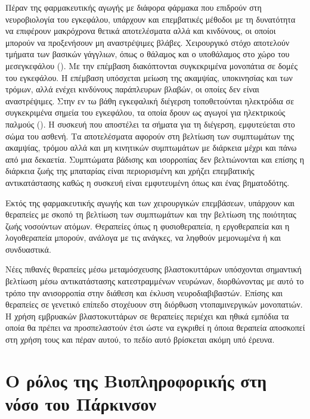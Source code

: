 \documentclass[12pt]{report}
\begin{document}
        \par
        Πέραν της φαρμακευτικής αγωγής με διάφορα φάρμακα που επιδρούν στη νευροβιολογία του εγκεφάλου, υπάρχουν και επεμβατικές μέθοδοι με τη δυνατότητα να επιφέρουν μακρόχρονα θετικά αποτελέσματα αλλά και κινδύνους, οι οποίοι μπορούν να προξενήσουν μη αναστρέψιμες βλάβες. Χειρουργικό στόχο αποτελούν τμήματα των βασικών γάγγλιων, όπως ο θάλαμος και ο υποθάλαμος στο χώρο του μεσεγκεφάλου (\emph{\cite{Starr1998AblativeDisease}}). Με την επέμβαση διακόπτονται συγκεκριμένα μονοπάτια σε δομές του εγκεφάλου. Η επέμβαση υπόσχεται μείωση της ακαμψίας, υποκινησίας και των τρόμων, αλλά ενέχει κινδύνους παράπλευρων βλαβών, οι οποίες δεν είναι αναστρέψιμες. Στην εν τω βάθη εγκεφαλική διέγερση τοποθετούνται ηλεκτρόδια σε συγκεκριμένα σημεία του εγκεφάλου, τα οποία δρουν ως αγωγοί για ηλεκτρικούς παλμούς (\emph{\cite{Fariba2023DeepStimulation}}). Η συσκευή που αποστέλει τα σήματα για τη διέγερση, εμφυτεύεται στο σώμα του ασθενή. Τα αποτελέσματα αφορούν στη βελτίωση των συμπτωμάτων της ακαμψίας, τρόμου αλλά και μη κινητικών συμπτωμάτων με διάρκεια μέχρι και πάνω από μια δεκαετία. Συμπτώματα βάδισης και ισορροπίας δεν βελτιώνονται και επίσης η διάρκεια ζωής της μπαταρίας είναι περιορισμένη και χρήζει επεμβατικής αντικατάστασης καθώς η συσκευή είναι εμφυτευμένη όπως και ένας βηματοδότης.
        \par
        Εκτός της φαρμακευτικής αγωγής και των χειρουργικών επεμβάσεων, υπάρχουν και θεραπείες με σκοπό τη βελτίωση των συμπτωμάτων και την βελτίωση της ποιότητας ζωής νοσούντων ατόμων. Θεραπείες όπως η φυσιοθεραπεία, η εργοθεραπεία και η λογοθεραπεία μπορούν, ανάλογα με τις ανάγκες, να ληφθούν μεμονωμένα ή και συνδυαστικά.
        \par
        Νέες πιθανές θεραπείες μέσω μεταμόσχευσης βλαστοκυττάρων υπόσχονται σημαντική βελτίωση μέσω αντικατάστασης κατεστραμμένων νευρώνων, διορθώνοντας με αυτό το τρόπο την ανισορροπία στην διάθεση και έκλυση νευροδιαβιβαστών. Επίσης και θεραπείες σε γενετικό επίπεδο στοχέυουν στη διόρθωση ντοπαμινεργικών μονοπατιών. Η χρήση εμβρυακών βλαστοκυττάρων σε θεραπείες περιέχει και ηθικά εμπόδια τα οποία θα πρέπει να προσπελαστούν έτσι ώστε να εγκριθεί η όποια θεραπεία αποσκοπεί στη χρήση τους και πέραν αυτού, το πεδίο αυτό βρίσκεται ακόμη υπό έρευνα.
        
        \section{Ο ρόλος της Βιοπληροφορικής στη νόσο του Πάρκινσον}
        
\end{document}

